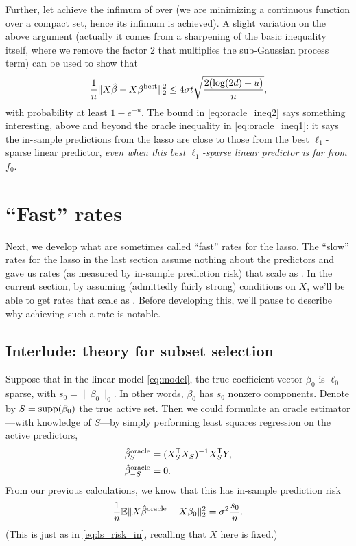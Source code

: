 \documentclass{article}
\begin{document}
Further, let  achieve the infimum of
 over  (we are minimizing a continuous function over a compact set, hence
its infimum is achieved). A slight variation on the above argument (actually it
comes from a sharpening of the basic inequality itself, where we remove the 
factor 2 that multiplies the sub-Gaussian process term) can be used to show that 
\begin{equation}
\label{eq:oracle_ineq2}
\frac{1}{n} \|X\hat{\beta} - X\bar\beta^{\text{best}}\|_2^2 \leq 4 \sigma t
\sqrt{\frac{2 (\log(2d) + u)}{n}},    
\end{equation}
with probability at least $1-e^{-u}$. The bound in \eqref{eq:oracle_ineq2} says
something interesting, above and beyond the oracle inequality in
\eqref{eq:oracle_ineq1}: it says the in-sample predictions from the lasso are 
close to those from the best $\ell_1$-sparse linear predictor, \emph{even when
  this best $\ell_1$-sparse linear predictor is far from $f_0$}.    

\section{``Fast'' rates}

Next, we develop what are sometimes called ``fast'' rates for the lasso. The
``slow'' rates for the lasso in the last section assume nothing about the
predictors and gave us rates (as measured by in-sample prediction risk) that
scale as . In the current section, by assuming  
(admittedly fairly strong) conditions on $X$, we'll be able to get rates that
scale as . Before developing this, we'll pause to describe
why achieving such a rate is notable.  

\subsection{Interlude: theory for subset selection}

Suppose that in the linear model \eqref{eq:model}, the true coefficient vector 
$\beta_0$ is $\ell_0$-sparse, with $s_0 = \|\beta_0\|_0$. In other words,
$\beta_0$ has $s_0$ nonzero components. Denote by $S = \mathrm{supp}(\beta_0)$ the true
active set. Then we could formulate an oracle estimator---with knowledge of
$S$---by simply performing least squares regression on the active predictors, 
\begin{align*}
\hat{\beta}_S^{\text{oracle}} &= (X_S^{\mathsf{T}} X_S)^{-1} X_S^{\mathsf{T}} Y, \\
\hat{\beta}_{-S}^{\text{oracle}} &= 0.
\end{align*} 
From our previous calculations, we know that this has in-sample prediction risk 
\[
\frac{1}{n} \mathbb{E}\|X\hat{\beta}^{\text{oracle}} - X\beta_0\|_2^2 = \sigma^2
\frac{s_0}{n}.    
\]
(This is just as in \eqref{eq:ls_risk_in}, recalling that $X$ here is fixed.) 
\end{document}
